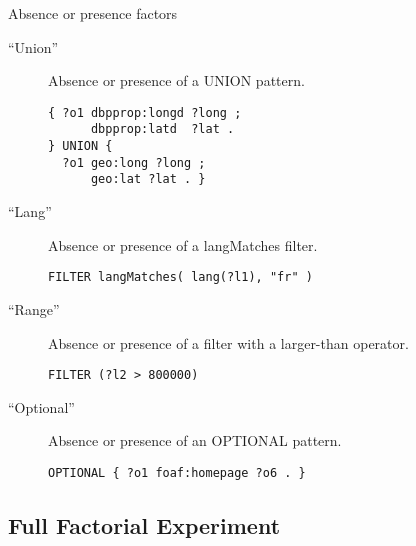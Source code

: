 \documentclass[english,usenames,dvipsnames,aspectratio=169]{beamer}
\begin{document}
\begin{frame}[fragile]{Absence or presence factors}
  \begin{description}
  \item [``Union''] Absence or presence of a \textsf{UNION} pattern.

    \begin{verbatim}
{ ?o1 dbpprop:longd ?long ;
      dbpprop:latd  ?lat .
} UNION {
  ?o1 geo:long ?long ;
      geo:lat ?lat . }
\end{verbatim} 

  \item [``Lang''] Absence or presence of a \textsf{langMatches}
    filter.

\begin{verbatim}
FILTER langMatches( lang(?l1), "fr" ) 
\end{verbatim} 


  \item [``Range''] Absence or presence of a filter with a larger-than
    operator.

    \begin{verbatim}
FILTER (?l2 > 800000)
\end{verbatim} 

  \item [``Optional''] Absence or presence of an \textsf{OPTIONAL}
    pattern.
    \begin{verbatim}
OPTIONAL { ?o1 foaf:homepage ?o6 . }
\end{verbatim} 

  \end{description}
\end{frame}


\subsection{Full Factorial Experiment}
\end{document}

